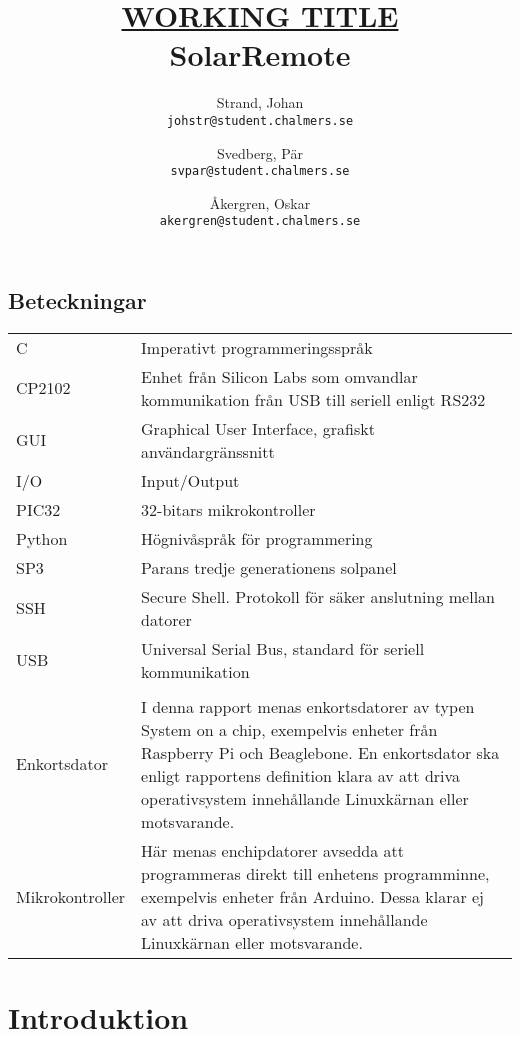 \documentclass{article}
\author{    Strand, Johan \\ \texttt{johstr@student.chalmers.se} \and
            Svedberg, Pär\\ \texttt{svpar@student.chalmers.se} \and
            Åkergren, Oskar\\ \texttt{akergren@student.chalmers.se}
}
\title{\underline{\small{WORKING TITLE}} \\ SolarRemote}
\begin{document}
    \maketitle
    \thispagestyle{empty}

    \newpage 
    \subsection*{Beteckningar} %
    \label{beteckningar}
        \begin{tabularx}{\textwidth}{@{}lX}
            C & Imperativt programmeringsspråk \\
            CP2102 & Enhet från Silicon Labs som omvandlar kommunikation från
            USB till seriell enligt RS232\\
            GUI & Graphical User Interface, grafiskt användargränssnitt \\
            I/O & Input/Output \\
            PIC32 & 32-bitars mikrokontroller \\
            Python & Högnivåspråk för programmering \\
            SP3 & Parans tredje generationens solpanel \\
            SSH & Secure Shell. Protokoll för säker anslutning mellan datorer\\
            USB & Universal Serial Bus, standard för seriell kommunikation \\
            \\
            Enkortsdator & I denna rapport menas enkortsdatorer av typen System
            on a chip, exempelvis enheter från Raspberry Pi och Beagle\-bone. 
            En enkortsdator ska enligt rapportens definition klara av att driva 
            operativsystem innehållande Linuxkärnan eller mot\-svarande. \\
            Mikrokontroller & Här menas enchipdatorer avsedda att programmeras 
            direkt till enhetens programminne, exempelvis enheter från 
            \hbox{Arduino}. Dessa klarar ej av att driva operativsystem 
            innehållande Linux\-kärnan eller motsvarande.\\
            

        \end{tabularx}
    \newpage

    \tableofcontents

    \newpage

    \section{Introduktion} %
    \label{sec:introduktion}
\end{document}
